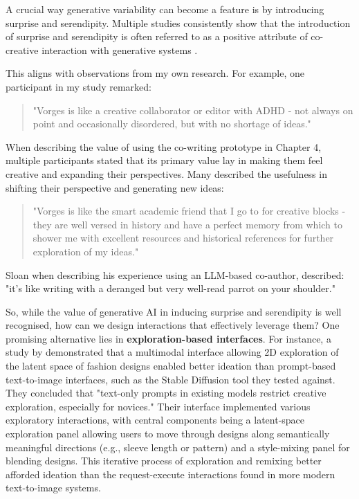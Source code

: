 A crucial way generative variability can become a feature is by introducing surprise and serendipity. Multiple studies consistently show that the introduction of surprise and serendipity is often referred to as a positive attribute of co-creative interaction with generative systems \cite{Lawton2023-tb, Chiou2023-vr, Louie2020-aq, Moruzzi2022-gp, Park2024-gw, Koch2020-gx}.

This aligns with observations from my own research. For example, one participant in my study remarked:

\begin{quote}
"Vorges is like a creative collaborator or editor with ADHD - not always on point and occasionally disordered, but with no shortage of ideas."
\end{quote}

When describing the value of using the co-writing prototype in Chapter 4, multiple participants stated that its primary value lay in making them feel creative and expanding their perspectives. Many described the usefulness in shifting their perspective and generating new ideas:

\begin{quote}
"Vorges is like the smart academic friend that I go to for creative blocks - they are well versed in history and have a perfect memory from which to shower me with excellent resources and historical references for further exploration of my ideas."
\end{quote}

Sloan \cite{Sloan2016-fj} when describing his experience using an LLM-based co-author, described: "it's like writing with a deranged but very well-read parrot on your shoulder."

So, while the value of generative AI in inducing surprise and serendipity is well recognised, how can we design interactions that effectively leverage them? One promising alternative lies in \textbf{exploration-based interfaces}. For instance, a study by \cite{Davis2024-ml} demonstrated that a multimodal interface allowing 2D exploration of the latent space of fashion designs enabled better ideation than prompt-based text-to-image interfaces, such as the Stable Diffusion tool they tested against. They concluded that "text-only prompts in existing models restrict creative exploration, especially for novices." Their interface implemented various exploratory interactions, with central components being a latent-space exploration panel allowing users to move through designs along semantically meaningful directions (e.g., sleeve length or pattern) and a style-mixing panel for blending designs. This iterative process of exploration and remixing better afforded ideation than the request-execute interactions found in more modern text-to-image systems. 

